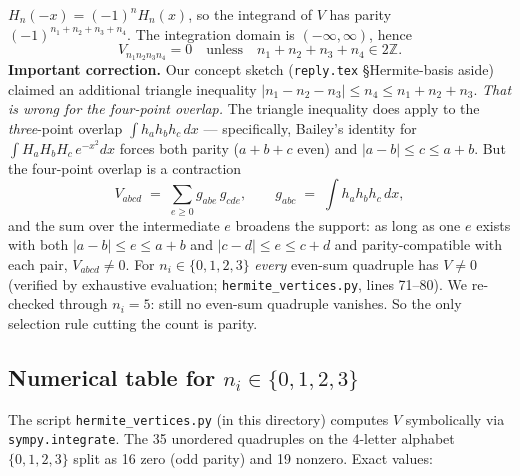 \documentclass[11pt,a4paper]{article}
\begin{document}
$H_{n}(-x) = (-1)^{n}H_{n}(x)$, so the integrand of $V$ has parity
$(-1)^{n_{1}+n_{2}+n_{3}+n_{4}}$. The integration domain is $(-\infty,\infty)$, hence
\[
\boxed{\;V_{n_{1}n_{2}n_{3}n_{4}} = 0 \quad\text{unless}\quad n_{1}+n_{2}+n_{3}+n_{4}\in 2\mathbb Z.\;}
\]
\textbf{Important correction.} Our concept sketch (\texttt{reply.tex} \S Hermite-basis
aside) claimed an additional triangle inequality $|n_{1}-n_{2}-n_{3}|\le n_{4} \le
n_{1}+n_{2}+n_{3}$. \emph{That is wrong for the four-point overlap.} The triangle
inequality does apply to the \emph{three}-point overlap $\int h_{a}h_{b}h_{c}\,dx$ ---
specifically, Bailey's identity \cite{Bailey} for $\int H_{a}H_{b}H_{c}\,e^{-x^{2}}dx$
forces both parity ($a+b+c$ even) and $|a-b|\le c\le a+b$. But the four-point overlap is a
contraction
\[
V_{abcd} \;=\; \sum_{e\ge 0} g_{abe}\,g_{cde},\qquad
g_{abc} \;=\; \int h_{a}h_{b}h_{c}\,dx,
\]
and the sum over the intermediate $e$ broadens the support: as long as one $e$ exists with
both $|a-b|\le e\le a+b$ and $|c-d|\le e\le c+d$ and parity-compatible with each pair,
$V_{abcd}\ne 0$. For $n_{i}\in\{0,1,2,3\}$ \emph{every} even-sum quadruple has
$V\ne 0$ (verified by exhaustive evaluation; \texttt{hermite\_vertices.py}, lines 71--80).
We re-checked through $n_{i}=5$: still no even-sum quadruple vanishes. So the only
selection rule cutting the count is parity.

\subsection{Numerical table for $n_{i}\in\{0,1,2,3\}$}

The script \texttt{hermite\_vertices.py} (in this directory) computes $V$ symbolically via
\texttt{sympy.integrate}. The 35 unordered quadruples on the $4$-letter alphabet
$\{0,1,2,3\}$ split as 16 zero (odd parity) and 19 nonzero. Exact values:
\end{document}

